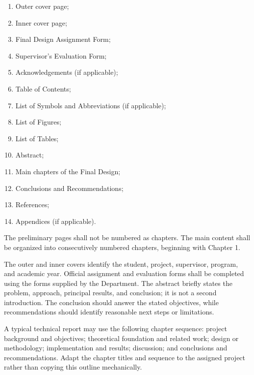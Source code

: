 {\begin{enumerate}[label=\arabic*., leftmargin=1.2cm, itemsep=2pt]
    \item Outer cover page;
    \item Inner cover page;
    \item Final Design Assignment Form;
    \item Supervisor's Evaluation Form;
    \item Acknowledgements (if applicable);
    \item Table of Contents;
    \item List of Symbols and Abbreviations (if applicable);
    \item List of Figures;
    \item List of Tables;
    \item Abstract;
    \item Main chapters of the Final Design;
    \item Conclusions and Recommendations;
    \item References;
    \item Appendices (if applicable).
\end{enumerate}

The preliminary pages shall not be numbered as chapters. The main
content shall be organized into consecutively numbered chapters,
beginning with Chapter 1.


The outer and inner covers identify the student, project, supervisor,
program, and academic year. Official assignment and evaluation forms
shall be completed using the forms supplied by the Department. The
abstract briefly states the problem, approach, principal results, and
conclusion; it is not a second introduction. The conclusion should
answer the stated objectives, while recommendations should identify
reasonable next steps or limitations.

\RegExample A typical technical report may use the following chapter
sequence: project background and objectives; theoretical foundation
and related work; design or methodology; implementation and results;
discussion; and conclusions and recommendations. Adapt the chapter
titles and sequence to the assigned project rather than copying this
outline mechanically.

\vspace{0.3cm}


}
